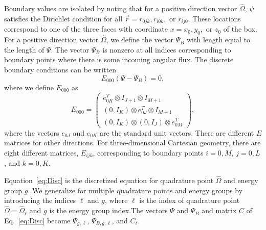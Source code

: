 Boundary values are isolated by noting that for a positive direction vector $\hat{\Omega}$, $\psi$ satisfies the Dirichlet condition for all $\vec{r} = r_{0jk}, r_{i0k},$ or $r_{ij0}$. These locations correspond to one of the three faces with coordinate $x = x_{0}, y_{0},$ or $z_{0}$ of the box. For a positive direction vector $\hat{\Omega}$, we define the vector $\Psi_{B}$ with length equal to the length of $\Psi$. The vector $\Psi_{B}$ is nonzero at all indices corresponding to boundary points where there is some incoming angular flux. The discrete boundary conditions can be written
\begin{equation}
	E_{000}(\Psi - \Psi_{B}) = 0,
\end{equation}
where we define $E_{000}$ as
\begin{equation}
	E_{000} = \begin{pmatrix}
				e_{0K}^{T} \otimes I_{J+1} \otimes I_{M+1} \\
				(0,I_{K}) \otimes e_{0J}^{T} \otimes I_{M+1} \\
				(0,I_{K}) \otimes (0,I_{J}) \otimes e_{0M}^{T}
			\end{pmatrix},
\end{equation}
where the vectors $e_{0J}$ and $e_{0K}$ are the standard unit vectors. There are different $E$ matrices for other directions. For three-dimensional Cartesian geometry, there are eight different matrices, $E_{ijk}$, corresponding to boundary points $i=0,M$, $j=0,L$, and $k = 0,K$.

Equation~\ref{eq:Disc} is the discretized equation for quadrature point $\hat{\Omega}$ and energy group $g$. We generalize for multiple quadrature points and energy groups by introducing the indices $\ell$ and $g$, where $\ell$ is the index of quadrature point $\hat{\Omega} = \hat{\Omega}_{\ell}$ and $g$ is the energy group index.The vectors $\Psi$ and $\Psi_{B}$ and matrix $C$ of Eq.~\ref{eq:Disc} become $\Psi_{g,\ell}$, $\Psi_{B,g,\ell}$, and $C_{\ell}$.

